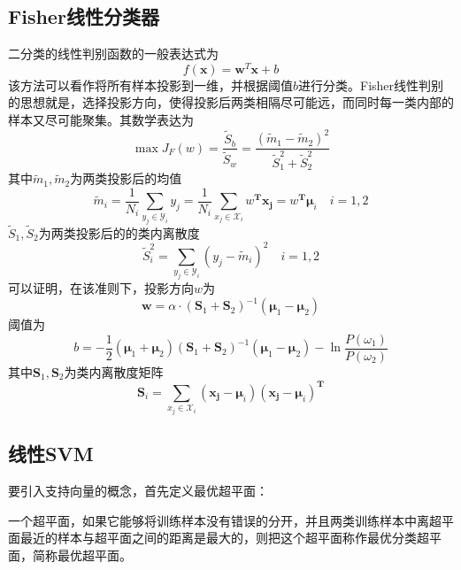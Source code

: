 \subsection{Fisher线性分类器}
二分类的线性判别函数的一般表达式为
\begin{equation}
f(\mathbf{x}) = \mathbf{w}^T \mathbf{x} + b
\end{equation}
该方法可以看作将所有样本投影到一维，并根据阈值$b$进行分类。Fisher线性判别的思想就是，选择投影方向，使得投影后两类相隔尽可能远，而同时每一类内部的样本又尽可能聚集。其数学表达为
\begin{equation}
\max J_F(w)=\frac{\tilde{S}_b}{\tilde{S}_w}=\frac{(\tilde{m}_1-\tilde{m}_2)^2}{\tilde{S}_1^2+\tilde{S}_2^2}
\end{equation}
其中$\tilde{m}_1, \tilde{m}_2$为两类投影后的均值
\begin{equation}
\tilde{m}_i=\frac1{N_i}\sum_{y_j\in \mathcal{Y}_i}y_j=\frac1{N_i}\sum_{x_j\in \mathcal{X}_i}w^\mathbf{T}\boldsymbol{x_j}=w^\mathbf{T}\boldsymbol{\mu}_i\quad i=1,2
\end{equation}
$\tilde{S}_1, \tilde{S}_2$为两类投影后的的类内离散度
\begin{equation}
\tilde{S}_i^2=\sum_{y_j\in \mathcal{Y}_i}(y_j-\tilde{m}_i)^2\quad i=1,2
\end{equation}
可以证明，在该准则下，投影方向$w$为
\begin{equation}
\mathbf{w} = \alpha \cdot (\mathbf{S}_1 + \mathbf{S}_2)^{-1} (\boldsymbol{\mu}_1 - \boldsymbol{\mu}_2)
\end{equation}
阈值为
\begin{equation}
b = -\frac12(\boldsymbol{\mu}_1 + \boldsymbol{\mu}_2)(\mathbf{S}_1 + \mathbf{S}_2)^{-1} (\boldsymbol{\mu}_1 - \boldsymbol{\mu}_2)-\ln\frac{P(\omega_1)}{P(\omega_2)}
\end{equation}
其中$\mathbf{S}_1, \mathbf{S}_2$为类内离散度矩阵
\begin{equation}
\mathbf{S}_i=\sum_{x_j\in \mathcal{X}_i}(\boldsymbol{x_j}-\boldsymbol{\mu}_i)(\boldsymbol{x_j}-\boldsymbol{\mu}_i)^\mathbf{T}
\end{equation}

\subsection{线性SVM}
要引入支持向量的概念，首先定义{\hei 最优超平面}：
\begin{theorem}
一个超平面，如果它能够将训练样本没有错误的分开，并且两类训练样本中离超平面最近的样本与超平面之间的距离是最大的，则把这个超平面称作最优分类超平面，简称最优超平面。
\end{theorem}

